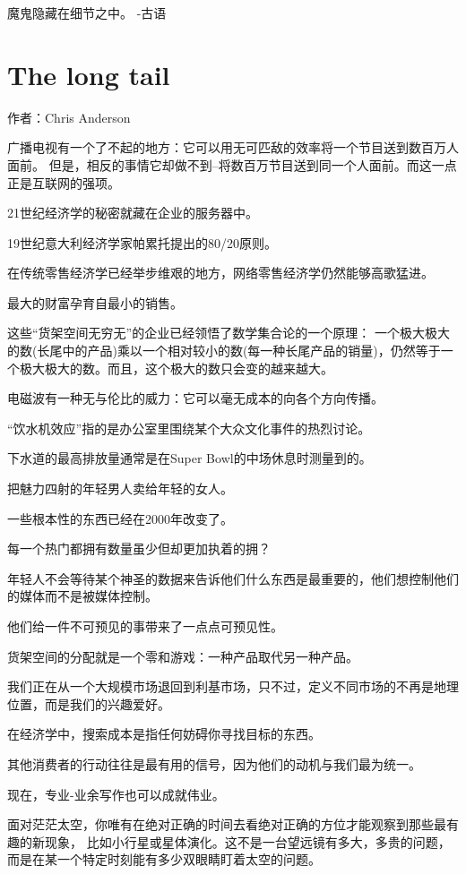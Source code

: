 魔鬼隐藏在细节之中。    -古语

\section{The long tail}
作者：Chris Anderson

广播电视有一个了不起的地方：它可以用无可匹敌的效率将一个节目送到数百万人面前。
但是，相反的事情它却做不到--将数百万节目送到同一个人面前。而这一点正是互联网的强项。

21世纪经济学的秘密就藏在企业的服务器中。

19世纪意大利经济学家帕累托提出的80/20原则。

在传统零售经济学已经举步维艰的地方，网络零售经济学仍然能够高歌猛进。

最大的财富孕育自最小的销售。

这些“货架空间无穷无”的企业已经领悟了数学集合论的一个原理：
一个极大极大的数(长尾中的产品)乘以一个相对较小的数(每一种长尾产品的销量)，仍然等于一个极大极大的数。而且，这个极大的数只会变的越来越大。

电磁波有一种无与伦比的威力：它可以毫无成本的向各个方向传播。

“饮水机效应”指的是办公室里围绕某个大众文化事件的热烈讨论。

下水道的最高排放量通常是在Super Bowl的中场休息时测量到的。

把魅力四射的年轻男人卖给年轻的女人。

一些根本性的东西已经在2000年改变了。

每一个热门都拥有数量虽少但却更加执着的拥？

年轻人不会等待某个神圣的数据来告诉他们什么东西是最重要的，他们想控制他们的媒体而不是被媒体控制。

他们给一件不可预见的事带来了一点点可预见性。

货架空间的分配就是一个零和游戏：一种产品取代另一种产品。

我们正在从一个大规模市场退回到利基市场，只不过，定义不同市场的不再是地理位置，而是我们的兴趣爱好。

在经济学中，搜索成本是指任何妨碍你寻找目标的东西。

其他消费者的行动往往是最有用的信号，因为他们的动机与我们最为统一。

现在，专业-业余写作也可以成就伟业。

面对茫茫太空，你唯有在绝对正确的时间去看绝对正确的方位才能观察到那些最有趣的新现象，
比如小行星或星体演化。这不是一台望远镜有多大，多贵的问题，而是在某一个特定时刻能有多少双眼睛盯着太空的问题。

